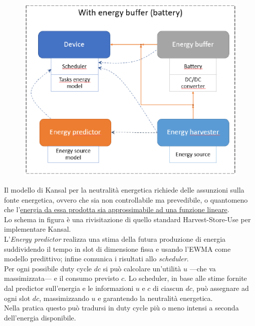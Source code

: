 \begin{figure}[htbp]
   \centering
   \includegraphics{images/questions/Schermata del 2023-10-20 11-57-01.png}
   \label{fig:dom27}
\end{figure}

Il modello di Kansal per la neutralità energetica richiede delle assunzioni sulla fonte energetica, ovvero che sia non controllabile ma prevedibile, o quantomeno che l'\ul{energia da essa prodotta sia approssimabile ad una funzione lineare}.\\
Lo schema in figura è una rivisitazione di quello standard Harvest-Store-Use per implementare Kansal.\\
L'\textit{Energy predictor} realizza una stima della futura produzione di energia suddividendo il tempo in slot di dimensione fissa e usando l'EWMA come modello predittivo; infine comunica i risultati allo \textit{scheduler}.\\
Per ogni possibile duty cycle $dc$ si può calcolare un'utilità $u$ ---che va massimizzata--- e il consumo previsto $c$.
Lo scheduler, in base alle stime fornite dal predictor sull'energia e le informazioni $u$ e $c$ di ciascun $dc$, può assegnare ad ogni slot $dc$, massimizzando $u$ e garantendo la neutralità energetica.\\
Nella pratica questo può tradursi in duty cycle più o meno intensi a seconda dell'energia disponibile.

